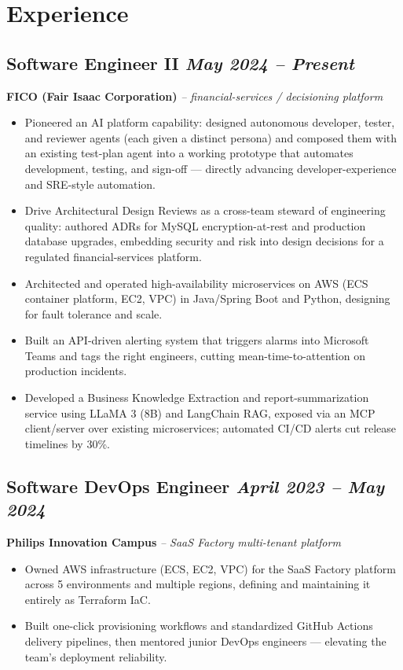\documentclass[11pt,a4paper]{article}
\begin{document}
\section{Experience}

\subsection{Software Engineer II \hfill \textit{May 2024 -- Present}}
\textbf{FICO (Fair Isaac Corporation)} \quad \textit{-- financial-services / decisioning platform}
\begin{itemize}
    \item Pioneered an AI platform capability: designed autonomous developer, tester, and reviewer agents (each given a distinct persona) and composed them with an existing test-plan agent into a working prototype that automates development, testing, and sign-off --- directly advancing developer-experience and SRE-style automation.
    \item Drive Architectural Design Reviews as a cross-team steward of engineering quality: authored ADRs for MySQL encryption-at-rest and production database upgrades, embedding security and risk into design decisions for a regulated financial-services platform.
    \item Architected and operated high-availability microservices on AWS (ECS container platform, EC2, VPC) in Java/Spring Boot and Python, designing for fault tolerance and scale.
    \item Built an API-driven alerting system that triggers alarms into Microsoft Teams and tags the right engineers, cutting mean-time-to-attention on production incidents.
    \item Developed a Business Knowledge Extraction and report-summarization service using LLaMA 3 (8B) and LangChain RAG, exposed via an MCP client/server over existing microservices; automated CI/CD alerts cut release timelines by 30\%.
\end{itemize}

\subsection{Software DevOps Engineer \hfill \textit{April 2023 -- May 2024}}
\textbf{Philips Innovation Campus} \quad \textit{-- SaaS Factory multi-tenant platform}
\begin{itemize}
    \item Owned AWS infrastructure (ECS, EC2, VPC) for the SaaS Factory platform across 5 environments and multiple regions, defining and maintaining it entirely as Terraform IaC.
    \item Built one-click provisioning workflows and standardized GitHub Actions delivery pipelines, then mentored junior DevOps engineers --- elevating the team's deployment reliability.
\end{itemize}
\end{document}
